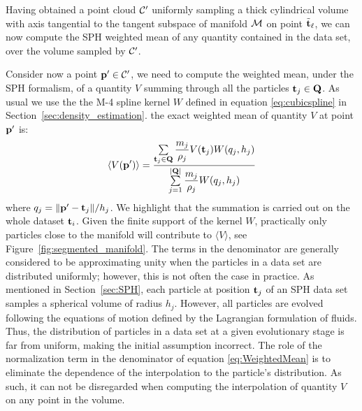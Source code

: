 Having obtained a point cloud $\mathcal{C}'$ uniformly sampling a thick cylindrical volume with axis tangential to the tangent subspace of manifold $\mathcal{M}$ on point $\tilde{\boldsymbol{\mathbf{t}}}_\ell$,
we can now compute the SPH weighted mean of any quantity contained in the data set, over the volume sampled by $\mathcal{C}'$.

Consider now a point $\boldsymbol{\mathbf{p}}' \in \mathcal{C}'$, we need to compute the weighted mean, under the SPH formalism, of a quantity $V$ summing through all the particles $\boldsymbol{\mathbf{t}}_j \in \boldsymbol{\mathbf{Q}}$.
As usual we use the the M-4 spline kernel $W$ defined in equation \eqref{eq:cubicspline} in Section~\ref{sec:density_estimation}.
the exact weighted mean of quantity $V$ at point $\boldsymbol{\mathbf{p}}'$ is:
\begin{equation}\label{eq:WeightedMean}
  \langle V(\boldsymbol{\mathbf{p}}') \rangle = \dfrac{\sum\limits_{\boldsymbol{\mathbf{t}}_j \in \boldsymbol{\mathbf{Q}}} \dfrac{m_j}{\rho_j} V(\boldsymbol{\mathbf{t}}_j) W(q_j,h_j)}{\sum\limits_{j=1}^{|\boldsymbol{\mathbf{Q}}|} \dfrac{m_j}{\rho_j} W(q_j,h_j)}
\end{equation}
where $q_j = \norm{\boldsymbol{\mathbf{p}}' - \boldsymbol{\mathbf{t}}_j}/h_j$.
We highlight that the summation is carried out on the whole dataset $\boldsymbol{\mathbf{t}}_i$.
Given the finite support of the kernel $W$, practically only particles close to the manifold will contribute to $\langle V \rangle$, see Figure~\ref{fig:segmented_manifold}.
The terms in the denominator are generally considered to be approximating unity when the particles in a data set are distributed uniformly; however, this is not often the case in practice.
As mentioned in Section~\ref{sec:SPH}, each particle at position $\boldsymbol{\mathbf{t}}_j$ of an SPH data set samples a spherical volume of radius $h_j$.
However, all particles are evolved following the equations of motion defined by the Lagrangian formulation of fluids.
Thus, the distribution of particles in a data set at a given evolutionary stage is far from uniform, making the initial assumption incorrect.
The role of the normalization term
in the denominator of equation \ref{eq:WeightedMean} is to eliminate the dependence of the interpolation to the particle's distribution.
As such, it can not be disregarded when computing the interpolation of quantity $V$ on any point in the volume.

